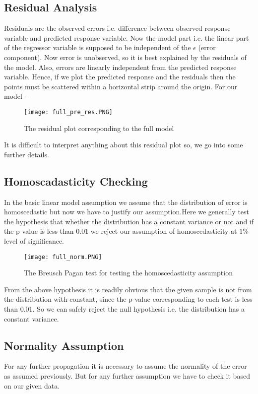 \documentclass[A4paper,11pt]{report}
\begin{document}
	 \subsection{Residual Analysis}
	 Residuals are the observed errors i.e. difference between observed response variable and predicted response variable. Now the model part i.e. the linear part of the regressor variable is supposed to be independent of the $\epsilon$ (error component). Now error is unobserved, so it is best explained by the residuals of the model. Also, errors are linearly independent from the predicted response variable. Hence, if we plot the predicted response and the residuals then the points must be scattered within a horizontal strip around the origin. For our model --
	 \begin{figure}[H]
	 	\texttt{[image: full\_pre\_res.PNG]}
	 	\caption{The residual plot corresponding to the full model}
	 \end{figure}
	 It is difficult to interpret anything about this residual plot so, we go into some further details.
	 \subsection{Homoscadasticity Checking} 
	 In the basic linear model assumption we assume that the distribution of error is homoscedastic but now we have to justify our assumption.Here we generally test the hypothesis that whether the distribution has a constant variance or not and if the p-value is less than 0.01 we reject our assumption of homoscedasticity at 1\% level of significance.
	 \begin{figure}[H]
	 	\texttt{[image: full\_norm.PNG]}
	 	\caption{The Breusch Pagan test for testing the homoscedasticity assumption}
	 \end{figure}
	 From the above hypothesis it is readily obvious that the given sample is not from the  distribution with constant, since the p-value corresponding to each test is less than 0.01. So we can safely reject the null hypothesis i.e. the distribution has a constant variance.
	 \subsection{Normality Assumption}
	 For any further propagation it is necessary to assume the normality of the error as assumed previously. But for any further assumption we have to check it based on our given data. 
\end{document}
